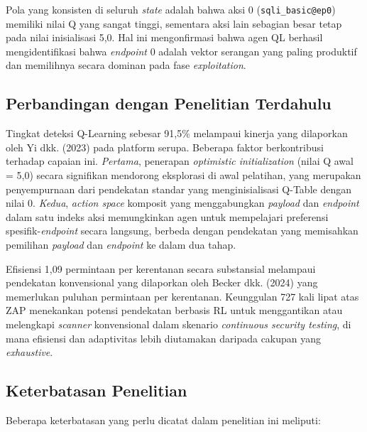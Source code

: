 Pola yang konsisten di seluruh \textit{state} adalah bahwa aksi 0 (\texttt{sqli\_basic@ep0}) memiliki nilai Q yang sangat tinggi, sementara aksi lain sebagian besar tetap pada nilai inisialisasi 5,0. Hal ini mengonfirmasi bahwa agen QL berhasil mengidentifikasi bahwa \textit{endpoint} 0 adalah vektor serangan yang paling produktif dan memilihnya secara dominan pada fase \textit{exploitation}.

\subsection{Perbandingan dengan Penelitian Terdahulu}

Tingkat deteksi Q-Learning sebesar 91,5\% melampaui kinerja yang dilaporkan oleh Yi dkk. (2023) pada platform serupa. Beberapa faktor berkontribusi terhadap capaian ini. \textit{Pertama}, penerapan \textit{optimistic initialization} (nilai Q awal = 5,0) secara signifikan mendorong eksplorasi di awal pelatihan, yang merupakan penyempurnaan dari pendekatan standar yang menginisialisasi Q-Table dengan nilai 0. \textit{Kedua}, \textit{action space} komposit yang menggabungkan \textit{payload} dan \textit{endpoint} dalam satu indeks aksi memungkinkan agen untuk mempelajari preferensi spesifik-\textit{endpoint} secara langsung, berbeda dengan pendekatan yang memisahkan pemilihan \textit{payload} dan \textit{endpoint} ke dalam dua tahap.

Efisiensi 1,09 permintaan per kerentanan secara substansial melampaui pendekatan konvensional yang dilaporkan oleh Becker dkk. (2024) yang memerlukan puluhan permintaan per kerentanan. Keunggulan 727 kali lipat atas ZAP menekankan potensi pendekatan berbasis RL untuk menggantikan atau melengkapi \textit{scanner} konvensional dalam skenario \textit{continuous security testing}, di mana efisiensi dan adaptivitas lebih diutamakan daripada cakupan yang \textit{exhaustive}.

\subsection{Keterbatasan Penelitian}

Beberapa keterbatasan yang perlu dicatat dalam penelitian ini meliputi:

